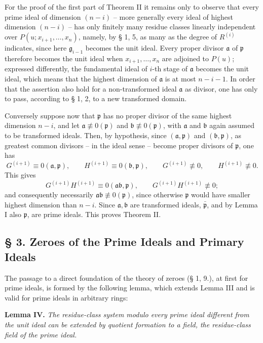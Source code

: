 \documentclass[11pt]{article}
\providecommand{\frakp}{\mathfrak p}
\providecommand{\fraka}{\mathfrak a}
\providecommand{\frakb}{\mathfrak b}
\providecommand{\frakg}{\mathfrak g}
\providecommand{\fraka}{\mathfrak a}
\providecommand{\frakp}{\mathfrak p}
\providecommand{\frakp}{\mathfrak p}
\begin{document}
For the proof of the first part of Theorem II it remains only to observe that every prime ideal of dimension $(n-i)$ -- more generally every ideal of highest dimension $(n-i)$ -- has only finitely many residue classes linearly independent over $P(u;x_{i+1},\ldots,x_n)$, namely, by § 1, 5, as many as the degree of $R^{(i)}$ indicates, since here $\frakg_{i-1}$ becomes the unit ideal. Every proper divisor $\fraka$ of $\frakp$ therefore becomes the unit ideal when $x_{i+1},\ldots,x_n$ are adjoined to $P(u)$; expressed differently, the fundamental ideal of $i$-th stage of $\fraka$ becomes the unit ideal, which means that the highest dimension of $\fraka$ is at most $n-i-1$. In order that the assertion also hold for a non-transformed ideal $\fraka$ as divisor, one has only to pass, according to § 1, 2, to a new transformed domain.

Conversely suppose now that $\frakp$ has no proper divisor of the same highest dimension $n-i$, and let $\fraka\not\equiv0(\frakp)$ and $\frakb\not\equiv0(\frakp)$, with $\fraka$ and $\frakb$ again assumed to be transformed ideals. Then, by hypothesis, since $(\fraka,\frakp)$ and $(\frakb,\frakp)$, as greatest common divisors -- in the ideal sense -- become proper divisors of $\frakp$, one has
\[
 G^{(i+1)}\equiv0(\fraka,\frakp),\qquad
 H^{(i+1)}\equiv0(\frakb,\frakp),\qquad
 G^{(i+1)}\not\equiv0,\qquad
 H^{(i+1)}\not\equiv0.
\]
This gives
\[
 G^{(i+1)}H^{(i+1)}\equiv0(\fraka\frakb,\frakp),\qquad
 G^{(i+1)}H^{(i+1)}\not\equiv0;
\]
and consequently necessarily $\fraka\frakb\not\equiv0(\frakp)$, since otherwise $\frakp$ would have smaller highest dimension than $n-i$. Since $\fraka,\frakb$ are transformed ideals, $\bar{\frakp}$, and by Lemma I also $\frakp$, are prime ideals. This proves Theorem II.

\subsection*{§ 3. Zeroes of the Prime Ideals and Primary Ideals}

The passage to a direct foundation of the theory of zeroes (§ 1, 9.), at first for prime ideals, is formed by the following lemma, which extends Lemma III and is valid for prime ideals in arbitrary rings:

\textbf{Lemma IV.} \emph{The residue-class system modulo every prime ideal different from the unit ideal can be extended by quotient formation to a field, the residue-class field of the prime ideal.}
\end{document}
